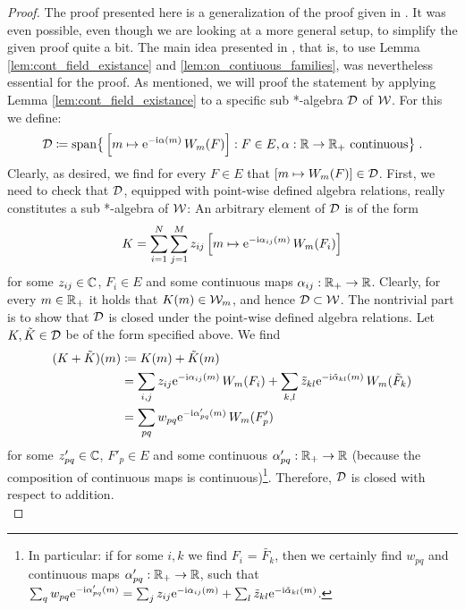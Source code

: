 \begin{proof}
	The proof presented here is a generalization of the proof given in \cite[Theorem 5.2]{rieckers_honegger_deformation}. It was even possible, even though we are looking at a more general setup,  to simplify the given proof quite a bit. The main idea presented in \cite{rieckers_honegger_deformation}, that is, to use Lemma \ref{lem:cont_field_existance} and \ref{lem:on_contiuous_families}, was nevertheless essential for the proof.
	As mentioned, we will proof the statement by applying Lemma \ref{lem:cont_field_existance} to a specific sub *-algebra $\mathcal{D}$ of $\mathcal{W}$. For this we define:
	\begin{align}
		\mathcal{D} \coloneqq \textrm{span}\big\{ \left[  m \mapsto \mathrm{e}^{-\text{\upshape{i}} \alpha(m)} \, W_m(F)  \right]: F\in E, \alpha : \mathbb{R} \to \mathbb{R}_+ \text{ continuous} \big\}  \;.
	\end{align}
	Clearly, as desired, we find for every $F \in E$ that $\left[ m \mapsto W_m(F) \right] \in \mathcal{D} $. 
	First, we need to check that $\mathcal{D}$, equipped with point-wise defined algebra relations, really constitutes a sub *-algebra of $\mathcal{W}$: 
	An arbitrary element of $\mathcal{D}$ is of the form
	\begin{align}
		K = \sum\limits_{i=1}^{N} \sum\limits_{j=1}^{M} z_{ij} \left[ m \mapsto \mathrm{e}^{-\text{\upshape{i}} \alpha_{ij}(m) }\,W_m(F_i) \right] \label{def:K_arb_element_D}
	\end{align}
	for some $z_{ij} \in \mathbb{C}$, $F_i \in E$ and some continuous maps $\alpha_{ij} : \mathbb{R}_+ \to \mathbb{R}$. 
	Clearly, for every $m \in \mathbb{R}_+$ it holds that $K(m) \in \mathcal{W}_m$, and hence $\mathcal{D} \subset \mathcal{W}$. The nontrivial part is to show that $\mathcal{D}$ is closed under the point-wise defined algebra relations.
	Let $K, \tilde{K} \in \mathcal{D}$ be of the form specified above. We find
	\begin{align}
		(K + \tilde{K})(m)
		&\coloneqq K(m) + \tilde{K}(m) \notag \\
		&= \sum\limits_{i,j} z_{ij} \mathrm{e}^{-\text{\upshape{i}} \alpha_{ij}(m) }\,W_m(F_i)   + \sum\limits_{k,l} \tilde{z}_{kl} \mathrm{e}^{-\text{\upshape{i}} \tilde{\alpha}_{kl}(m) }\,W_m(\tilde{F}_k)  \notag \\
		&= \sum\limits_{pq} w_{pq} \mathrm{e}^{-\text{\upshape{i}} \alpha'_{pq}(m) }\,W_m(F'_{p}) 
	\end{align} 
	for some $z'_{pq} \in \mathbb{C}$, $F'_{p} \in E$ and some continuous $\alpha'_{pq} : \mathbb{R}_+ \to \mathbb{R}$ (because the composition of continuous maps is continuous)\footnote{In particular: if for some $i, k$ we find $F_i$ = $\tilde{F_k}$, then we certainly find $w_{pq}$ and continuous maps $\alpha'_{pq} : \mathbb{R}_+ \to \mathbb{R}$, such that $\sum_q w_{pq} \mathrm{e}^{-\text{\upshape{i}} \alpha'_{pq}(m) } = \sum_j z_{ij} \mathrm{e}^{-\text{\upshape{i}} \alpha_{ij}(m) } + \sum_l \tilde{z}_{kl} \mathrm{e}^{-\text{\upshape{i}} \tilde{\alpha}_{kl}(m) }$.}.	Therefore, $\mathcal{D}$ is closed with respect to addition. \\

\end{proof}
